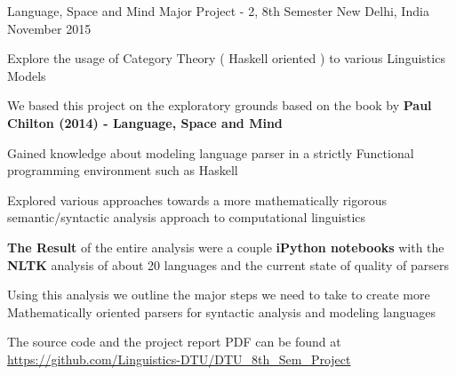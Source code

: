 \begin{cventries}
 \cventry
    {Language, Space and Mind}
    {Major Project - 2, 8th Semester }
    {New Delhi, India }
    {November 2015}
    {
      \begin{cvitems}
        \item {Explore the usage of Category Theory ( Haskell oriented ) to various Linguistics Models }
        \item {We based this project on the exploratory grounds based on the book by \textbf{Paul Chilton (2014) - Language, Space and Mind}}    
		\item {Gained knowledge about modeling language parser in a strictly Functional programming environment such as Haskell} 
		\item {Explored various approaches towards a more mathematically rigorous semantic/syntactic analysis approach to computational linguistics}         
        \item{\textbf{The Result} of the entire analysis were a couple \textbf{iPython notebooks} with the \textbf{NLTK} analysis of about 20 languages and the current state of quality of parsers}
    	\item{Using this analysis we outline the major steps we need to take to create more Mathematically oriented parsers for syntactic analysis and modeling languages}    
        \item{The source code and the project report PDF can be found at \\ \url{https://github.com/Linguistics-DTU/DTU_8th_Sem_Project}}
      \end{cvitems}
    }


\end{cventries}
